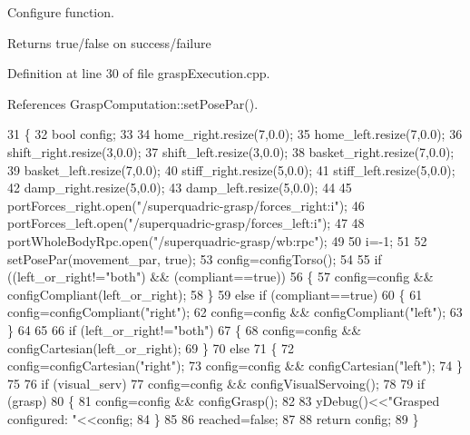 Configure function. 

\begin{DoxyReturn}{Returns}
true/false on success/failure 
\end{DoxyReturn}


Definition at line 30 of file grasp\+Execution.\+cpp.



References Grasp\+Computation\+::set\+Pose\+Par().


\begin{DoxyCode}
31 \{
32     \textcolor{keywordtype}{bool} config;
33 
34     home\_right.resize(7,0.0);
35     home\_left.resize(7,0.0);
36     shift\_right.resize(3,0.0);
37     shift\_left.resize(3,0.0);
38     basket\_right.resize(7,0.0);
39     basket\_left.resize(7,0.0);
40     stiff\_right.resize(5,0.0);
41     stiff\_left.resize(5,0.0);
42     damp\_right.resize(5,0.0);
43     damp\_left.resize(5,0.0);
44 
45     portForces\_right.open(\textcolor{stringliteral}{"/superquadric-grasp/forces\_right:i"});
46     portForces\_left.open(\textcolor{stringliteral}{"/superquadric-grasp/forces\_left:i"});
47 
48     portWholeBodyRpc.open(\textcolor{stringliteral}{"/superquadric-grasp/wb:rpc"});
49 
50     i=-1;
51 
52     setPosePar(movement_par, \textcolor{keyword}{true});
53     config=configTorso();
54 
55     \textcolor{keywordflow}{if} ((left\_or\_right!=\textcolor{stringliteral}{"both"}) && (compliant==\textcolor{keyword}{true}))
56     \{
57         config=config && configCompliant(left\_or\_right);
58     \}
59     \textcolor{keywordflow}{else} \textcolor{keywordflow}{if} (compliant==\textcolor{keyword}{true})
60     \{
61         config=configCompliant(\textcolor{stringliteral}{"right"});
62         config=config && configCompliant(\textcolor{stringliteral}{"left"});
63     \}
64 
65 
66     \textcolor{keywordflow}{if} (left\_or\_right!=\textcolor{stringliteral}{"both"})
67     \{
68         config=config && configCartesian(left\_or\_right);
69     \}
70     \textcolor{keywordflow}{else}
71     \{
72         config=configCartesian(\textcolor{stringliteral}{"right"});
73         config=config && configCartesian(\textcolor{stringliteral}{"left"});
74     \}
75 
76     \textcolor{keywordflow}{if} (visual\_serv)
77         config=config && configVisualServoing();
78 
79     \textcolor{keywordflow}{if} (grasp)
80     \{
81         config=config && configGrasp();
82 
83         yDebug()<<\textcolor{stringliteral}{"Grasped configured: "}<<config;
84     \}
85 
86     reached=\textcolor{keyword}{false};
87 
88     \textcolor{keywordflow}{return} config;
89 \}
\end{DoxyCode}
